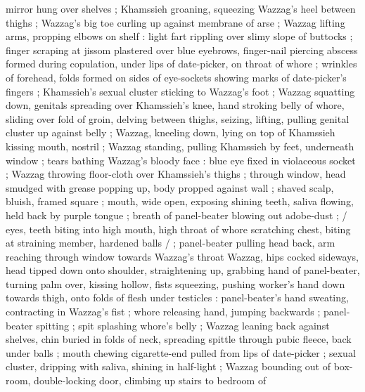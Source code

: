mirror hung over shelves ; Khamssieh groaning, squeezing Wazzag's heel between thighs ; Wazzag's big
toe curling up against membrane of arse ; Wazzag lifting arms, propping elbows on shelf : light fart
rippling over slimy slope of buttocks ; finger scraping at jissom plastered over blue eyebrows,
finger-nail piercing abscess formed during copulation, under lips of date-picker, on throat of whore
; wrinkles of forehead, folds formed on sides of eye-sockets showing marks of date-picker's fingers
; Khamssieh's sexual cluster sticking to Wazzag's foot ; Wazzag squatting down, genitals spreading
over Khamssieh's knee, hand stroking belly of whore, sliding over fold of groin, delving between
thighs, seizing, lifting, pulling genital cluster up against belly ; Wazzag, kneeling down, lying on
top of Khamssieh kissing mouth, nostril  ; Wazzag standing, pulling Khamssieh by feet, underneath window ;
tears bathing Wazzag's bloody face : blue eye fixed in violaceous socket ; Wazzag throwing
floor-cloth over Khamssieh's thighs ; through window, head smudged with grease popping up, body
propped against wall ; shaved scalp, bluish, framed %
square ; mouth, wide open, exposing shining teeth, saliva flowing, held back by purple tongue
 ; breath of panel-beater blowing out adobe-dust ;
{\fourdots} {\slash} eyes, teeth biting into high mouth, high throat of whore scratching chest,
biting at straining member, hardened balls {\slash} {\fourdots} ; panel-beater pulling head back,
arm reaching through window towards Wazzag's throat Wazzag, hips cocked sideways, head tipped down
onto shoulder, straightening up, grabbing hand of panel-beater, turning palm over, kissing hollow,
fists squeezing, pushing worker's hand down towards thigh, onto folds of flesh under testicles :
panel-beater's hand sweating, contracting in Wazzag's fist ; whore releasing hand, jumping backwards
; panel-beater spitting ; spit splashing whore's belly ; Wazzag leaning back against shelves, chin
buried in folds of neck, spreading spittle through pubic fleece, back under balls ; mouth chewing
cigarette-end pulled from lips of date-picker ; sexual cluster, dripping with saliva, shining in
half-light ; Wazzag bounding out of box-room, double-locking door, climbing up stairs to bedroom of
